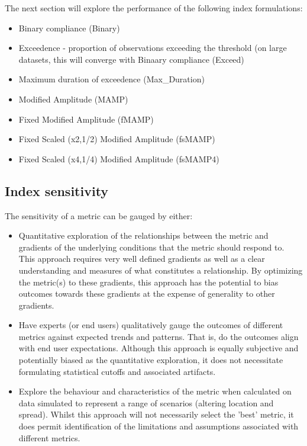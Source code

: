 The next section will explore the performance of the following index formulations:
\begin{itemize}
  \item Binary compliance (Binary)
  \item Exceedence - proportion of observations exceeding the threshold (on large datasets, this will converge with Binaary compliance (Exceed)
  \item Maximum duration of exceedence (Max\_Duration)
  \item Modified Amplitude (MAMP)
  \item Fixed Modified Amplitude (fMAMP)
  \item Fixed Scaled (x2,1/2) Modified Amplitude (fsMAMP)
  \item Fixed Scaled (x4,1/4) Modified Amplitude (fsMAMP4)
\end{itemize}


\subsection{Index sensitivity}\label{sec:indexSensitivity}

The sensitivity of a metric can be gauged by either:
\begin{itemize}
\item Quantitative exploration of the relationships between the metric and gradients of the
underlying conditions that the metric should respond to. This approach requires very well defined
gradients as well as a clear understanding and measures of what constitutes a relationship.  By
optimizing the metric(s) to these gradients, this approach has the potential to bias outcomes
towards these gradients at the expense of generality to other gradients.
\item Have experts (or end users) qualitatively gauge the outcomes of different metrics against
expected trends and patterns.  That is, do the outcomes align with end user expectations.  Although
this approach is equally subjective and potentially biased as the quantitative exploration, it does
not necessitate formulating statistical cutoffs and associated artifacts.
\item Explore the behaviour and characteristics of the metric when calculated on data simulated to
represent a range of scenarios (altering location and spread).  Whilst this approach will not
necessarily select the 'best' metric, it does permit identification of the limitations and
assumptions associated with different metrics.
\end{itemize}

